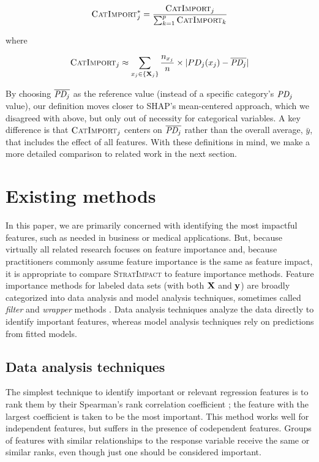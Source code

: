 \documentclass[smallextended]{svjour3}       %
\newcommand{\CImpo}{\fontfamily{cmr}\textsc{CatImport}}
\newcommand{\simp}{\fontfamily{cmr}\textsc{\small StratImpact}}
\begin{document}
\begin{equation}\label{eq:Epd2b}
\CImpo_j^{*} = \frac{\CImpo_j}{\sum_{k=1}^p \CImpo_k}
\end{equation}

\noindent where

\begin{equation}\label{eq:Epd2c}
\CImpo_j \approx \sum_{x_j \in \{{\bf X}_j\}} \frac{n_{x_j}}{n} \times |PD_j(x_j)- \overline{\text{\it PD}_j}|
\end{equation}

By choosing $\overline{\text{\it PD}_j}$ as the reference value (instead of a specific category's $\text{\it PD}_j$ value), our definition moves closer to SHAP's mean-centered approach, which we disagreed with above, but only out of necessity for categorical variables. A key difference is that $\CImpo_j$ centers on $\overline{\text{\it PD}_j}$ rather than the overall average, $\bar{y}$, that includes the effect of all features. With these definitions in mind, we make a more detailed comparison to related work in the next section.

\section{Existing methods}\label{sec:existing}

In this paper, we are primarily concerned with identifying the most impactful features, such as needed in business or medical applications. But, because virtually all related research focuses on feature importance and, because practitioners commonly assume feature importance is the same as feature impact, it is appropriate to compare \simp{} to  feature importance methods. Feature importance methods for labeled data sets (with both $\bf X$ and $\bf y$) are broadly categorized into data analysis and model analysis techniques, sometimes called {\em filter} and {\em wrapper} methods \citep{tsanas}. Data analysis techniques analyze the data directly to identify important features, whereas model analysis techniques rely on predictions from fitted models.

\subsection{Data analysis techniques}

The simplest technique to identify important or relevant regression features is to rank them by their Spearman's rank correlation coefficient \citep{spearmans}; the feature with the largest coefficient is taken to be the most important. This method works well for independent features, but suffers in the presence of codependent features.   Groups of features with similar relationships to the response variable receive the same or similar ranks, even though just one should be considered important.
\end{document}
